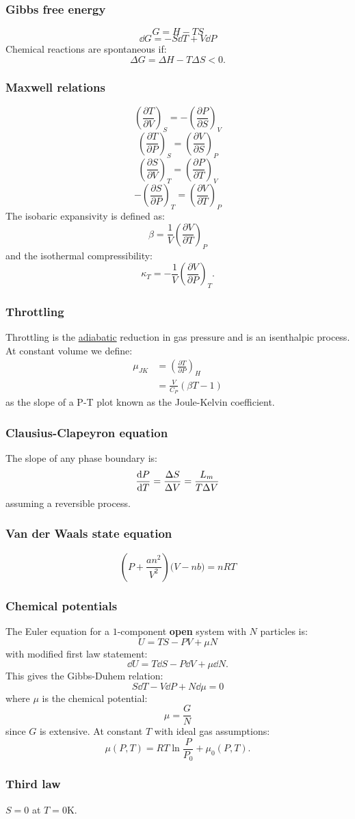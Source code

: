 \documentclass{article}
\begin{document}
\begin{multicols*}{3}
\subsubsection*{Gibbs free energy}
$$G=H-TS$$
$$\dd G=-S\dd T+V\dd P$$
Chemical reactions are spontaneous if:
$$\Delta G=\Delta H-T\Delta S<0.$$

\subsubsection*{Maxwell relations}
$$\left(\frac{\partial T}{\partial V}\right)_S
=-\left(\frac{\partial P}{\partial S}\right)_V$$
$$\left(\frac{\partial T}{\partial P}\right)_S
=\left(\frac{\partial V}{\partial S}\right)_P$$
$$\left(\frac{\partial S}{\partial V}\right)_T
=\left(\frac{\partial P}{\partial T}\right)_V$$
$$-\left(\frac{\partial S}{\partial P}\right)_T
=\left(\frac{\partial V}{\partial T}\right)_P$$
The isobaric expansivity is defined as:
$$\beta=\frac{1}{V}
\left(\frac{\partial V}{\partial T}\right)_P$$
and the isothermal compressibility:
$$\kappa_T=-\frac{1}{V}
\left(\frac{\partial V}{\partial P}\right)_T.$$

\subsubsection*{Throttling}
Throttling is the \underline{adiabatic} 
reduction in gas pressure
and is an isenthalpic process.
At constant volume we define:
\begin{align*}
    \mu_{JK}&=\left(
    \frac{\partial T}{\partial P}\right)_H \\
    &=\frac{V}{C_P}(\beta T-1)
\end{align*}
as the slope of a P-T plot
known as the
Joule-Kelvin coefficient.

\subsubsection*{Clausius-Clapeyron equation}
The slope of any phase boundary is:
$$\dv{P}{T}=\frac{\Delta S}{\Delta V}
=\frac{L_m}{T\Delta V}$$
assuming a reversible process.

\subsubsection*{Van der Waals state equation}
$$\left(P+\frac{an^2}{V^2}\right)
\bigl(V-nb\bigr)=nRT$$

\subsubsection*{Chemical potentials}
The Euler equation for a $1$-component
\textbf{open} system with
$N$ particles is:
$$U=TS-PV+\mu N$$
with modified first law statement: 
$$\dd U
=T\dd S-P\dd V+\mu\dd N.$$
This gives the Gibbs-Duhem relation:
$$S\dd T-V\dd P+N\dd\mu=0$$
where $\mu$ is the chemical potential:
$$\mu=\frac{G}{N}$$
since $G$ is extensive. At constant $T$
with ideal gas assumptions:
$$\mu(P,T)=RT\ln\frac{P}{P_0}+\mu_0(P,T).$$

\subsubsection*{Third law}
$S=0$ at $T=0$K.

\end{multicols*}
\end{document}
